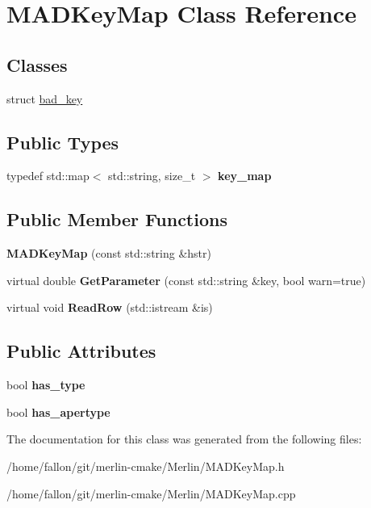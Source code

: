 \hypertarget{classMADKeyMap}{}\section{M\+A\+D\+Key\+Map Class Reference}
\label{classMADKeyMap}
\subsection*{Classes}
\begin{DoxyCompactItemize}
\item 
struct \hyperlink{structMADKeyMap_1_1bad__key}{bad\+\_\+key}
\end{DoxyCompactItemize}
\subsection*{Public Types}
\begin{DoxyCompactItemize}
\item 
\mbox{\label{classMADKeyMap_a024c1991023f003ad16c9fb0b652c8f6}} 
typedef std\+::map$<$ std\+::string, size\+\_\+t $>$ {\bfseries key\+\_\+map}
\end{DoxyCompactItemize}
\subsection*{Public Member Functions}
\begin{DoxyCompactItemize}
\item 
\mbox{\label{classMADKeyMap_ab6f8993e4e7085c27f3745a05272b5b8}} 
{\bfseries M\+A\+D\+Key\+Map} (const std\+::string \&hstr)
\item 
\mbox{\label{classMADKeyMap_a7b21089cff1ecdc76ae3530d88c07b56}} 
virtual double {\bfseries Get\+Parameter} (const std\+::string \&key, bool warn=true)
\item 
\mbox{\label{classMADKeyMap_ab5f651eeb437140e0f481e0146d827a0}} 
virtual void {\bfseries Read\+Row} (std\+::istream \&is)
\end{DoxyCompactItemize}
\subsection*{Public Attributes}
\begin{DoxyCompactItemize}
\item 
\mbox{\label{classMADKeyMap_a4f40b43f56a3a6283d3f54e9e8094efb}} 
bool {\bfseries has\+\_\+type}
\item 
\mbox{\label{classMADKeyMap_a1e185867d6fbac193c6f6a95a6ad885b}} 
bool {\bfseries has\+\_\+apertype}
\end{DoxyCompactItemize}


The documentation for this class was generated from the following files\+:\begin{DoxyCompactItemize}
\item 
/home/fallon/git/merlin-\/cmake/\+Merlin/M\+A\+D\+Key\+Map.\+h\item 
/home/fallon/git/merlin-\/cmake/\+Merlin/M\+A\+D\+Key\+Map.\+cpp\end{DoxyCompactItemize}

